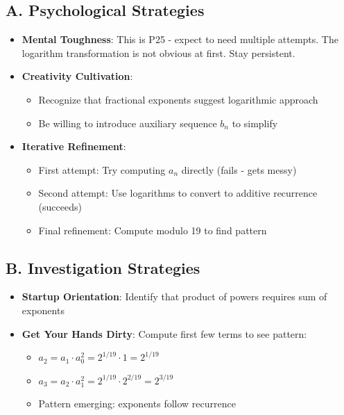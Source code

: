 \documentclass[11pt]{article}
\begin{document}
\begin{strategicbox}
\subsection*{A. Psychological Strategies}
\begin{itemize}[leftmargin=*]
    \item \textbf{Mental Toughness}: This is P25 - expect to need multiple attempts. The logarithm transformation is not obvious at first. Stay persistent.
    
    \item \textbf{Creativity Cultivation}: 
    \begin{itemize}
        \item Recognize that fractional exponents suggest logarithmic approach
        \item Be willing to introduce auxiliary sequence $b_n$ to simplify
    \end{itemize}
    
    \item \textbf{Iterative Refinement}: 
    \begin{itemize}
        \item First attempt: Try computing $a_n$ directly (fails - gets messy)
        \item Second attempt: Use logarithms to convert to additive recurrence (succeeds)
        \item Final refinement: Compute modulo 19 to find pattern
    \end{itemize}
\end{itemize}

\subsection*{B. Investigation Strategies}
\begin{itemize}[leftmargin=*]
    \item \textbf{Startup Orientation}: Identify that product of powers requires sum of exponents
    
    \item \textbf{Get Your Hands Dirty}: Compute first few terms to see pattern:
    \begin{itemize}
        \item $a_2 = a_1 \cdot a_0^2 = 2^{1/19} \cdot 1 = 2^{1/19}$
        \item $a_3 = a_2 \cdot a_1^2 = 2^{1/19} \cdot 2^{2/19} = 2^{3/19}$
        \item Pattern emerging: exponents follow recurrence
    \end{itemize}
    

\end{itemize}
\end{strategicbox}
\end{document}
